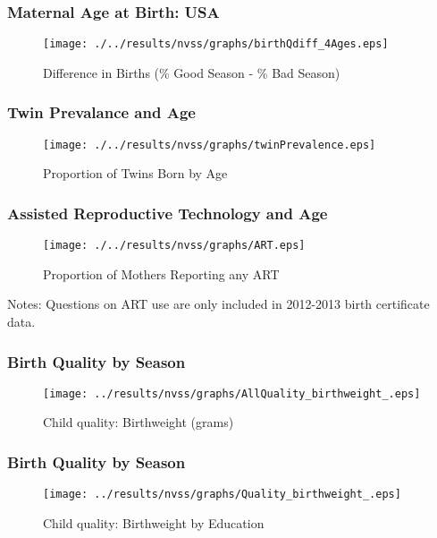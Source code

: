 \documentclass[10pt,letterpaper,subeqn]{beamer}
\begin{document}
\begin{frame}[label=births]
\frametitle{Maternal Age at Birth: USA}
\begin{figure}[htpb!]
\begin{center}
  \centering
  \caption{Difference in Births (\% Good Season - \% Bad Season)}
  \texttt{[image: ./../results/nvss/graphs/birthQdiff\_4Ages.eps]}
  \label{fig:NVSSbirthsAges}
\end{center}
\end{figure}
\vspace{-5mm}
\end{frame}

\begin{frame}[label=twins]
\frametitle{Twin Prevalance and Age}
\begin{figure}[htpb!]
\begin{center}
  \centering
  \caption{Proportion of Twins Born by Age}
  \texttt{[image: ./../results/nvss/graphs/twinPrevalence.eps]}
  \label{fig:NVSSTwins}
\end{center}
\end{figure}
\vspace{-5mm}
\end{frame}


\begin{frame}[label=ART]
\frametitle{Assisted Reproductive Technology and Age}
\begin{figure}[htpb!]
\begin{center}
  \centering
  \caption{Proportion of Mothers Reporting any ART}
  \texttt{[image: ./../results/nvss/graphs/ART.eps]}
  \label{fig:NVSSART}
\end{center}
\end{figure}
\vspace{-5mm}
\footnotesize{Notes: Questions on ART use are only included in 2012-2013 
birth certificate data.}
\end{frame}


\begin{frame}[label=QBw]
\frametitle{Birth Quality by Season}
\begin{figure}[htpb!]
\centering
\caption{Child quality: Birthweight (grams)}
\label{QBwt}
\texttt{[image: ../results/nvss/graphs/AllQuality\_birthweight\_.eps]}
\end{figure}
\end{frame}

\begin{frame}[label=QBwEd]
\frametitle{Birth Quality by Season}
\begin{figure}[htpb!]
\centering
\caption{Child quality: Birthweight by Education}
\label{QBwtEd}
\texttt{[image: ../results/nvss/graphs/Quality\_birthweight\_.eps]}
\end{figure}
\end{frame}
\end{document}
